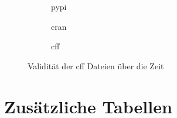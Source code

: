 \begin{figure}[H]
    \begin{subfigure}{.5\textwidth}
        \centering
        
        \caption{\gls{pypi}}
        \label{fig:valid_cff_by_time_pypi}
    \end{subfigure}%
    \begin{subfigure}{.5\textwidth}
        \centering
        
        \caption{\gls{cran}}
        \label{fig:valid_cff_by_time_cran}
    \end{subfigure}
    \centering
    \begin{subfigure}{.5\textwidth}
        \centering
        
        \caption{\gls{cff}}
        \label{fig:valid_cff_by_time_cff}
    \end{subfigure}
    \caption{Validität der \gls{cff} Dateien über die Zeit}
    \label{fig:valid_cff_by_time_anhang}
\end{figure}

\chapter{Zusätzliche Tabellen}
\label{chap:zusaetzliche_tabellen}

